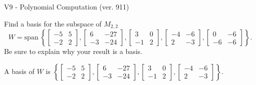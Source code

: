 \begin{exercise}
  \begin{exerciseTitle}V9 - Polynomial Computation (ver. 911)\end{exerciseTitle}
  \begin{exerciseStatement}
    Find a basis for the subspace of \(M_{2,2}\) 
\[W=\mathrm{span}\ \left\{\left[\begin{array}{cc}
-5 & 5 \\
-2 & 2
\end{array}\right] , \left[\begin{array}{cc}
6 & -27 \\
-3 & -24
\end{array}\right] , \left[\begin{array}{cc}
3 & 0 \\
-1 & 2
\end{array}\right] , \left[\begin{array}{cc}
-4 & -6 \\
2 & -3
\end{array}\right] , \left[\begin{array}{cc}
0 & -6 \\
-6 & -6
\end{array}\right]\right\}.\]
 Be sure to explain why your result is a basis.


  \end{exerciseStatement}
  \begin{exerciseAnswer}
   A basis of \(W\) is  \(\left\{\left[\begin{array}{cc}
-5 & 5 \\
-2 & 2
\end{array}\right] , \left[\begin{array}{cc}
6 & -27 \\
-3 & -24
\end{array}\right] , \left[\begin{array}{cc}
3 & 0 \\
-1 & 2
\end{array}\right] , \left[\begin{array}{cc}
-4 & -6 \\
2 & -3
\end{array}\right]\right\}\).
  


  \end{exerciseAnswer}
\end{exercise}
